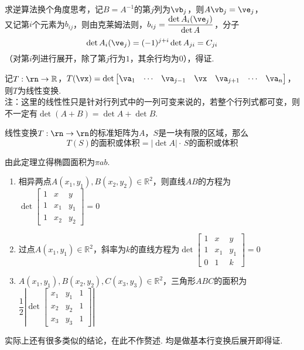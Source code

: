 \begin{analysis}求逆算法换个角度思考，记$B=A^{-1}$的第$j$列为$\vb_j$，则$A\vb_j=\ve_j$，\\
又记第$i$个元素为$b_{ij}$，则由克莱姆法则，$b_{ij}=\dfrac{\det A_i(\ve_j)}{\det A}$，分子
\[\det A_i(\ve_j)=(-1)^{j+i}\det A_{ji}=C_{ji}\]
（对第$i$列进行展开，除了第$j$行为$1$，其余行均为$0$），得证.
\end{analysis}
\begin{theorem}[行列式的线性性]
记$T:\rn\to\mathbb{R}$，$T(\vx)=\det\begin{bmatrix}\va_1&\cdots&\va_{j-1}&\vx&\va_{j+1}&\cdots&\va_n\end{bmatrix}$，则$T$为线性变换.\\
注：这里的线性性只是针对行列式中的一列可变来说的，若整个行列式都可变，则不一定有$\det (A+B)=\det A+\det B$.
\end{theorem}
\begin{theorem}[线性变换与体积变化]
线性变换$T:\rn\to\rn$的标准矩阵为$A$，$S$是一块有限的区域，那么
\[T(S)\text{的面积或体积}=|\det A|\cdot\,S\text{的面积或体积}\]
\end{theorem}
由此定理立得椭圆面积为$\pi a b$.
\begin{theorem}[解析几何]
\begin{enumerate}
	\item 相异两点$A(x_1,y_1),B(x_2,y_2)\in\mathbb{R}^2$，则直线$AB$的方程为$\det\begin{bmatrix}1&x&y\\1&x_1&y_1\\1&x_2&y_2\end{bmatrix}=0$
	\item 过点$A(x_1,y_1)\in\mathbb{R}^2$，斜率为$k$的直线方程为$\det\begin{bmatrix}1&x&y\\1&x_1&y_1\\0&1&k\end{bmatrix}=0$
	\item $A(x_1,y_1),B(x_2,y_2),C(x_3,y_3)\in\mathbb{R}^2$，三角形$ABC$的面积为$\dfrac{1}{2}\left|\det\begin{bmatrix}x_1&y_1&1\\x_2&y_2&1\\x_3&y_3&1\end{bmatrix}\right|$
\end{enumerate}
\end{theorem}
\begin{analysis}
实际上还有很多类似的结论，在此不作赘述. 均是做基本行变换后展开即得证.
\end{analysis}
